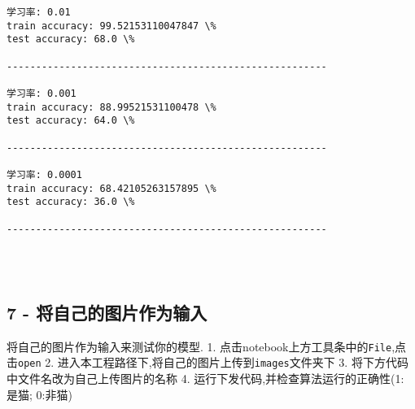 \documentclass[11pt]{article}
\begin{document}
    \begin{Verbatim}[commandchars=\\\{\}]
学习率: 0.01
train accuracy: 99.52153110047847 \%
test accuracy: 68.0 \%

-------------------------------------------------------

学习率: 0.001
train accuracy: 88.99521531100478 \%
test accuracy: 64.0 \%

-------------------------------------------------------

学习率: 0.0001
train accuracy: 68.42105263157895 \%
test accuracy: 36.0 \%

-------------------------------------------------------


    \end{Verbatim}

    \begin{center}
    \end{center}
    { \hspace*{\fill} \\}
    
    \subsection{7 -
将自己的图片作为输入}\label{ux5c06ux81eaux5df1ux7684ux56feux7247ux4f5cux4e3aux8f93ux5165}

将自己的图片作为输入来测试你的模型. 1.
点击notebook上方工具条中的\texttt{File},点击\texttt{open} 2.
进入本工程路径下,将自己的图片上传到\texttt{images}文件夹下 3.
将下方代码中文件名改为自己上传图片的名称 4.
运行下发代码,并检查算法运行的正确性(1: 是猫; 0:非猫)
\end{document}
